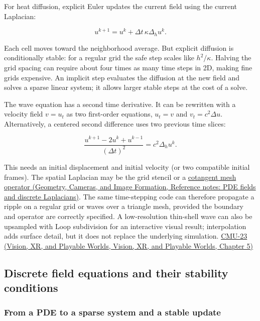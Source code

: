 For heat diffusion, explicit Euler updates the current field using the current Laplacian:

\[
u^{k+1}=u^k+\Delta t\,\kappa\Delta_h u^k.
\]

Each cell moves toward the neighborhood average. But explicit diffusion is conditionally stable: for a regular grid the safe step scales like \(h^2/\kappa\). Halving the grid spacing can require about four times as many time steps in 2D, making fine grids expensive. An implicit step evaluates the diffusion at the new field and solves a sparse linear system; it allows larger stable steps at the cost of a solve.

The wave equation has a second time derivative. It can be rewritten with a velocity field \(v=u_t\) as two first-order equations, \(u_t=v\) and \(v_t=c^2\Delta u\). Alternatively, a centered second difference uses two previous time slices:

\[
\frac{u^{k+1}-2u^k+u^{k-1}}{(\Delta t)^2}=c^2\Delta_h u^k.
\]

This needs an initial displacement and initial velocity (or two compatible initial frames). The spatial Laplacian may be the grid stencil or a \href{../03-Geometry-Cameras-and-Image-Formation/main.pdf\#nameddest=appendix-1988d465c119}{cotangent mesh operator (Geometry, Cameras, and Image Formation, Reference notes: PDE fields and discrete Laplacians)}. The same time-stepping code can therefore propagate a ripple on a regular grid or waves over a triangle mesh, provided the boundary and operator are correctly specified. A low-resolution thin-shell wave can also be upsampled with Loop subdivision for an interactive visual result; interpolation adds surface detail, but it does not replace the underlying simulation. \href{../07-Vision-XR-and-Playable-Worlds/main.pdf\#nameddest=04-visual-computing-ii-ch036-cmu-23---physically-based-animation-and-pdes}{CMU-23 (Vision, XR, and Playable Worlds, Vision, XR, and Playable Worlds, Chapter 5)}

\subsection{Discrete field equations and their stability conditions}\label{04-visual-computing-ii-ch030-discrete-field-equations-and-their-stability-conditions}

\subsubsection{From a PDE to a sparse system and a stable update}\label{04-visual-computing-ii-ch030-from-a-pde-to-a-sparse-system-and-a-stable-update}


